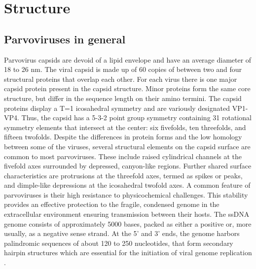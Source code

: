 

\section{Structure}

\subsection{Parvoviruses in general}

Parvovirus capsids are devoid of a lipid envelope and have an average diameter of 18 to 26 nm. The viral capsid is made up of 60 copies of between two and four structural proteins that overlap each other. For each virus there is one major capsid protein present in the capsid structure. Minor proteins form the same core structure, but differ in the sequence length on their amino termini. The capsid proteins display a T=1 icosahedral symmetry and are variously designated VP1-VP4. Thus, the capsid has a 5-3-2 point group symmetry containing 31 rotational symmetry elements that intersect at the center: six fivefolds, ten threefolds, and fifteen twofolds. 
Despite the differences in protein forms and the low homology between some of the viruses, several structural elements on the capsid surface are common to most parvoviruses. These include raised cylindrical channels at the fivefold axes surrounded by depressed, canyon-like regions. Further shared surface characteristics are protrusions at the threefold axes, termed as spikes or peaks, and dimple-like depressions at the icosahedral twofold axes.  
A common feature of parvoviruses is their high resistance to physicochemical challenges. This stability provides an effective protection to the fragile, condensed genome in the extracellular environment ensuring transmission between their hosts. The ssDNA  genome consists of approximately 5000 bases, packed as either a positive or, more usually, as a negative sense strand. At the 5’ and 3’ ends, the genome harbors palindromic sequences of about 120 to 250 nucleotides, that form secondary hairpin structures which are essential for the initiation of viral genome replication \cite{pmid16242744, pmid25555192, pmid8392729, pmid9817841, pmid11827486, pmid2006420, pmid12941411}. \\      

